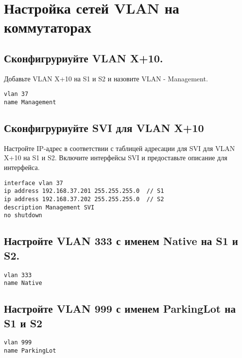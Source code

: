 \section{Настройка сетей VLAN на коммутаторах}

\subsection{Сконфигруриуйте VLAN X+10.}
Добавьте VLAN X+10 на S1 и S2 и назовите VLAN - Management.

\begin{verbatim}
vlan 37
name Management
\end{verbatim}

\subsection{Сконфигруриуйте SVI для VLAN X+10}
Настройте IP-адрес в соответствии с таблицей адресации для SVI для VLAN X+10 на S1 и S2.
Включите интерфейсы SVI и предоставьте описание для интерфейса.

\begin{verbatim}
interface vlan 37
ip address 192.168.37.201 255.255.255.0  // S1
ip address 192.168.37.202 255.255.255.0  // S2
description Management SVI
no shutdown
\end{verbatim}

\subsection{Настройте VLAN 333 с именем Native на S1 и S2.}

\begin{verbatim}
vlan 333
name Native
\end{verbatim}

\subsection{Настройте VLAN 999 с именем ParkingLot на S1 и S2}

\begin{verbatim}
vlan 999
name ParkingLot
\end{verbatim}

